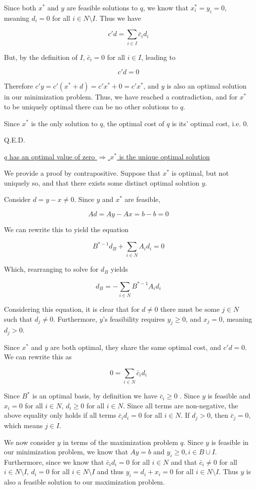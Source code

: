 \documentclass[11pt,a4paper]{article}
\begin{document}
Since both $x^*$ and $y$ are feasible solutions to $q$, we know that $x^*_i=y_i=0$, meaning $d_i=0$ for all $i\in N\texttt{\textbackslash}I$. Thus we have 

$$
c'd=\sum_{i\in I}\bar{c}_id_i
$$

But, by the definition of $I$, $\bar{c}_i=0$ for all $i\in I$, leading to

$$
c'd = 0
$$

Therefore $c'y=c'(x^*+d)=c'x^*+0=c'x^*$, and $y$ is also an optimal solution in our minimization problem. Thus, we have reached a contradiction, and for $x^*$ to be uniquely optimal there can be no other solutions to $q$.

Since $x^*$ is the only solution to $q$, the optimal cost of $q$ is its' optimal cost, i.e. 0.

Q.E.D.

\underline{$q$ has an optimal value of zero $\Rightarrow$ $x^*$ is the unique optimal solution }

We provide a proof by contrapositive. Suppose that $x^*$ is optimal, but not uniquely so, and that there exists some distinct optimal solution $y$.

Consider $d=y-x\neq 0$. Since $y$ and $x^*$ are feasible, 

$$
Ad=Ay-Ax=b-b=0
$$

We can rewrite this to yield the equation

$$
B^{*-1}d_B+\sum_{i\in N}A_id_i=0
$$

Which, rearranging to solve for $d_B$ yields

$$
d_B=-\sum_{i\in N}B^{*-1}A_id_i
$$

Considering this equation, it is clear that for $d\neq 0$ there must be some $j\in N$ such that $d_j\neq0$. Furthermore, $y$'s feasibility requires $y_j\geq 0$, and $x_j=0$, meaning $d_j>0$.

Since $x^*$ and $y$ are both optimal, they share the same optimal cost, and $c'd=0$. We can rewrite this as

$$
0=\sum_{i\in N}\bar{c}_id_i
$$

Since $B^*$ is an optimal basis, by definition we have $\bar{c}_i\geq 0$ . Since $y$ is feasible and $x_i=0$ for all $i\in N$, $d_i\geq 0$ for all $i\in N$. Since all terms are non-negative, the above equality only holds if all terms $\bar{c}_id_i=0$ for all $i\in N$. If $d_j>0$, then $\bar{c}_j=0$, which means $j\in I$.

We now consider $y$ in terms of the maximization problem $q$. Since $y$ is feasible in our minimization problem, we know that $Ay=b$ and $y_i\geq 0, i\in B\cup I$. Furthermore, since we know that $\bar{c}_id_i=0$ for all $i\in N$ and that $\bar{c}_i\neq 0$ for all $i\in N\texttt{\textbackslash}I$, $d_i=0$ for all $i\in N\texttt{\textbackslash}I$ and thus $y_i=d_i+x_i=0$ for all $i\in N\texttt{\textbackslash}I$. Thus $y$ is also a feasible solution to our maximization problem.
\end{document}
